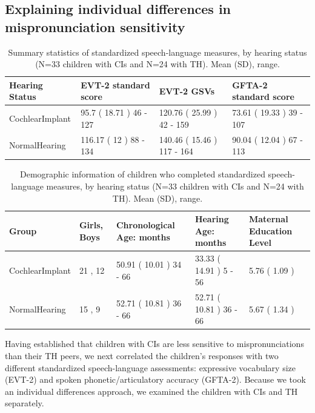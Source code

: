 \documentclass[
]{article}
\begin{document}
\hypertarget{explaining-individual-differences-in-mispronunciation-sensitivity}{%
\subsection{Explaining individual differences in mispronunciation sensitivity}\label{explaining-individual-differences-in-mispronunciation-sensitivity}}

\begin{table}[!h]

\caption{\label{tab:stan-meas-table}Summary statistics of standardized speech-language measures, by hearing status (N=33 children with CIs and N=24 with TH). Mean (SD), range.}
\centering
\begin{tabular}[t]{llll}
\toprule
Hearing Status & EVT-2 standard score & EVT-2 GSVs & GFTA-2 standard score\\
\midrule
CochlearImplant & 95.7 ( 18.71 ) 46 - 127 & 120.76 ( 25.99 ) 42 - 159 & 73.61 ( 19.33 ) 39 - 107\\
NormalHearing & 116.17 ( 12 ) 88 - 134 & 140.46 ( 15.46 ) 117 - 164 & 90.04 ( 12.04 ) 67 - 113\\
\bottomrule
\end{tabular}
\end{table}

\begin{table}[!h]

\caption{\label{tab:demo-tab-allkids}Demographic information of children who completed standardized speech-language measures, by hearing status (N=33 children with CIs and N=24 with TH). Mean (SD), range.}
\centering
\begin{tabular}[t]{lllll}
\toprule
Group & Girls, Boys & Chronological Age: months & Hearing Age: months & Maternal Education Level\\
\midrule
CochlearImplant & 21 , 12 & 50.91 ( 10.01 ) 34 - 66 & 33.33 ( 14.91 ) 5 - 56 & 5.76 ( 1.09 )\\
NormalHearing & 15 , 9 & 52.71 ( 10.81 ) 36 - 66 & 52.71 ( 10.81 ) 36 - 66 & 5.67 ( 1.34 )\\
\bottomrule
\end{tabular}
\end{table}

Having established that children with CIs are less sensitive to mispronunciations than their TH peers, we next correlated the children's responses with two different standardized speech-language assessments: expressive vocabulary size (EVT-2) and spoken phonetic/articulatory accuracy (GFTA-2). Because we took an individual differences approach, we examined the children with CIs and TH separately.
\end{document}
